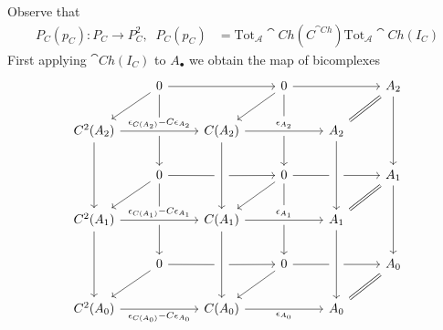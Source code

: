 Observe that
\begin{align*}
	P_C(p_C):P_C\to P_C^2,\;\; P_C(p_C) &= \text{Tot}_\mathcal{A}\cat{Ch}(C^{\cat{Ch}})\text{Tot}_\mathcal{A}\cat{Ch}(I_C)
\end{align*}
First applying $\cat{Ch}(I_C)$ to $A_\bullet$ we obtain the map of bicomplexes
\[\begin{tikzcd}
	& 0 && 0 && {A_2} \\
	{C^2(A_2)} && {C(A_2)} && {A_2} \\
	& 0 && 0 && {A_1} \\
	{C^2(A_1)} && {C(A_1)} && {A_1} \\
	& 0 && 0 && {A_0} \\
	{C^2(A_0)} && {C(A_0)} && {A_0}
	\arrow[from=3-6, to=5-6]
	\arrow[from=1-6, to=3-6]
	\arrow["{\epsilon_{C(A_0)}-C\epsilon_{A_0}}"', from=6-1, to=6-3]
	\arrow["{\epsilon_{A_0}}"', from=6-3, to=6-5]
	\arrow[Rightarrow, no head, from=5-6, to=6-5]
	\arrow[""{name=0, anchor=center, inner sep=0}, from=4-5, to=6-5]
	\arrow[Rightarrow, no head, from=3-6, to=4-5]
	\arrow[Rightarrow, no head, from=1-6, to=2-5]
	\arrow[""{name=1, anchor=center, inner sep=0}, from=2-5, to=4-5]
	\arrow[from=1-4, to=1-6]
	\arrow[from=1-2, to=1-4]
	\arrow[from=4-1, to=6-1]
	\arrow[""{name=2, anchor=center, inner sep=0}, from=4-3, to=6-3]
	\arrow[""{name=3, anchor=center, inner sep=0}, "{\epsilon_{C(A_1)}-C\epsilon_{A_1}}", from=4-1, to=4-3]
	\arrow[""{name=4, anchor=center, inner sep=0}, "{\epsilon_{A_1}}", from=4-3, to=4-5]
	\arrow[""{name=5, anchor=center, inner sep=0}, "{\epsilon_{A_2}}", from=2-3, to=2-5]
	\arrow[""{name=6, anchor=center, inner sep=0}, "{\epsilon_{C(A_2)}-C\epsilon_{A_2}}", from=2-1, to=2-3]
	\arrow[from=2-1, to=4-1]
	\arrow[""{name=7, anchor=center, inner sep=0}, from=2-3, to=4-3]
	\arrow[from=3-4, to=4-3]
	\arrow[from=3-2, to=4-1]
	\arrow[from=1-2, to=2-1]
	\arrow[from=1-4, to=2-3]
	\arrow[from=5-4, to=6-3]
	\arrow[from=5-2, to=6-1]
	\arrow[shorten >=11pt, no head, from=1-4, to=5]
	\arrow[shorten <=3pt, from=5, to=3-4]
	\arrow[shorten >=10pt, no head, from=1-2, to=6]
	\arrow[shorten >=5pt, no head, from=3-4, to=1]
	\arrow[shorten <=5pt, from=1, to=3-6]
	\arrow[shorten >=5pt, no head, from=5-4, to=0]
	\arrow[shorten <=5pt, from=0, to=5-6]
	\arrow[shorten <=3pt, from=6, to=3-2]
	\arrow[shorten >=5pt, no head, from=3-2, to=7]
	\arrow[shorten <=5pt, from=7, to=3-4]
	\arrow[shorten >=11pt, no head, from=3-4, to=4]
	\arrow[shorten <=3pt, from=4, to=5-4]
	\arrow[shorten >=5pt, no head, from=5-2, to=2]
	\arrow[shorten <=5pt, from=2, to=5-4]
	\arrow[shorten >=10pt, no head, from=3-2, to=3]
	\arrow[shorten <=3pt, from=3, to=5-2]
\end{tikzcd}\]
